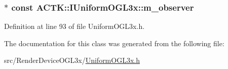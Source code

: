 \hypertarget{class_a_c_t_k_1_1_i_uniform_o_g_l3x_aa3e1cb91f8dd6c49c8545b920c26e143}{
\subsubsection[{m\-\_\-observer}]{$\ast$ const A\-C\-T\-K\-::\-I\-Uniform\-O\-G\-L3x\-::m\-\_\-observer\hspace{0.3cm}{\ttfamily [protected]}}}\label{class_a_c_t_k_1_1_i_uniform_o_g_l3x_aa3e1cb91f8dd6c49c8545b920c26e143}


Definition at line 93 of file Uniform\-O\-G\-L3x.\-h.



The documentation for this class was generated from the following file\-:\begin{DoxyCompactItemize}
\item 
src/\-Render\-Device\-O\-G\-L3x/\hyperlink{_uniform_o_g_l3x_8h}{Uniform\-O\-G\-L3x.\-h}\end{DoxyCompactItemize}
